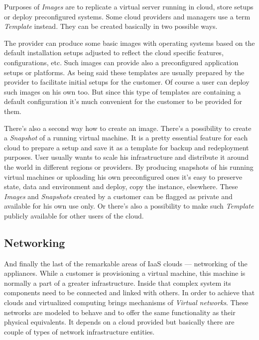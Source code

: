 Purposes of \emph{Images} are to replicate a virtual server running in cloud, store setups or deploy preconfigured systems. Some cloud providers and managers use a term \emph{Template} instead. They can be created basically in two possible ways.

The provider can produce some basic images with operating systems based on the default installation setups adjusted to reflect the cloud specific features, configurations, etc. Such images can provide also a preconfigured application setups or platforms. As being said these templates are usually prepared by the provider to facilitate initial setups for the customer. Of course a user can deploy such images on his own too. But since this type of templates are containing a default configuration it's much convenient for the customer to be provided for them.

There's also a second way how to create an image. There's a possibility to create a \emph{Snapshot} of a running virtual machine. It is a pretty essential feature for each cloud to prepare a setup and save it as a template for backup and redeployment purposes. User usually wants to scale his infrastructure and distribute it around the world in different regions or providers. By producing snapshots of his running virtual machines or uploading his own preconfigured ones it's easy to preserve state, data and environment and deploy, copy the instance, elsewhere. These \emph{Images} and \emph{Snapshots} created by a customer can be flagged as private and available for his own use only. Or there's also a possibility to make such \emph{Template} publicly available for other users of the cloud.

\subsection{Networking}
\label{sub:Networking}

And finally the last of the remarkable areas of IaaS clouds --- networking of the appliances. While a customer is provisioning a virtual machine, this machine is normally a part of a greater infrastructure. Inside that complex system its components need to be connected and linked with others. In order to achieve that clouds and virtualized computing brings mechanisms of \emph{Virtual networks}. These networks are modeled to behave and to offer the same functionality as their physical equivalents. It depends on a cloud provided but basically there are couple of types of network infrastructure entities.

